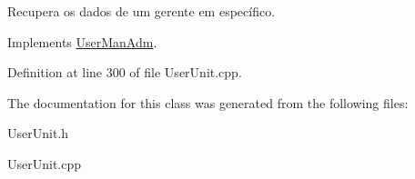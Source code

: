 Recupera os dados de um gerente em específico. 



Implements \hyperlink{classUserManAdm_a62e826d1c11061df021016e94e88f9ba}{User\-Man\-Adm}.



Definition at line 300 of file User\-Unit.\-cpp.



The documentation for this class was generated from the following files\-:\begin{DoxyCompactItemize}
\item 
User\-Unit.\-h\item 
User\-Unit.\-cpp\end{DoxyCompactItemize}
